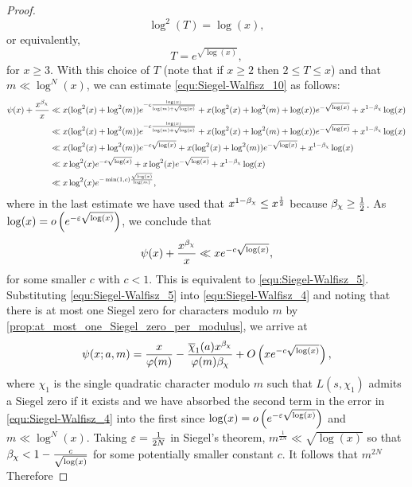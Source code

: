 \begin{proof}
      \[
        \log^{2}(T) = \log(x),
      \]
      or equivalently,
      \[
        T = e^{\sqrt{\log(x)}},
      \]
      for $x \ge 3$. With this choice of $T$ (note that if $x \ge 2$ then $2 \le T \le x$) and that $m \ll \log^{N}(x)$, we can estimate \cref{equ:Siegel-Walfisz_10} as follows:
      \begin{align*}
        \psi(x)+\frac{x^{\beta_{\chi}}}{x} &\ll x(\log^{2}(x)+\log^{2}(m))e^{-c\frac{\log(x)}{\log(m)+\sqrt{\log(x)}}}+x(\log^{2}(x)+\log^{2}(m)+\log(x))e^{-\sqrt{\log(x)}}+x^{1-\beta_{\chi}}\log(x) \\
        &\ll x(\log^{2}(x)+\log^{2}(m))e^{-c\frac{\log(x)}{\log(m)+\sqrt{\log(x)}}}+x(\log^{2}(x)+\log^{2}(m)+\log(x))e^{-\sqrt{\log(x)}}+x^{1-\beta_{\chi}}\log(x) \\
        &\ll x(\log^{2}(x)+\log^{2}(m))e^{-c\sqrt{\log(x)}}+x(\log^{2}(x)+\log^{2}(m))e^{-\sqrt{\log(x)}}+x^{1-\beta_{\chi}}\log(x) \\
        &\ll x\log^{2}(x)e^{-c\sqrt{\log(x)}}+x\log^{2}(x)e^{-\sqrt{\log(x)}}+x^{1-\beta_{\chi}}\log(x) \\
        &\ll x\log^{2}(x)e^{-\min(1,c)\frac{\sqrt{\log(x)}}{\log(m)}},
      \end{align*}
      where in the last estimate we have used that $x^{1-\beta_{\chi}} \le x^{\frac{1}{2}}$ because $\beta_{\chi} \ge \frac{1}{2}$. As $\log(x) = o\left(e^{-\varepsilon\sqrt{\log(x)}}\right)$, we conclude that
      \[
        \psi(x)+\frac{x^{\beta_{\chi}}}{x} \ll xe^{-c\sqrt{\log(x)}},
      \]
      for some smaller $c$ with $c < 1$. This is equivalent to \cref{equ:Siegel-Walfisz_5}. Substituting \cref{equ:Siegel-Walfisz_5} into \cref{equ:Siegel-Walfisz_4} and noting that there is at most one Siegel zero for characters modulo $m$ by \cref{prop:at_most_one_Siegel_zero_per_modulus}, we arrive at
      \begin{equation}\label{equ:Siegel-Walfisz_11}
        \psi(x;a,m) = \frac{x}{\varphi(m)}-\frac{\overline{\chi}_{1}(a)x^{\beta_{\chi}}}{\varphi(m)\beta_{\chi}}+O\left(xe^{-c\sqrt{\log(x)}}\right),
      \end{equation}
      where $\chi_{1}$ is the single quadratic character modulo $m$ such that $L(s,\chi_{1})$ admits a Siegel zero if it exists and we have absorbed the second term in the error in \cref{equ:Siegel-Walfisz_4} into the first since $\log(x) = o\left(e^{-\varepsilon\sqrt{\log(x)}}\right)$ and $m \ll \log^{N}(x)$. Taking $\varepsilon = \frac{1}{2N}$ in Siegel's theorem, $m^\frac{1}{2N} \ll \sqrt{\log(x)}$ so that $\beta_{\chi} < 1-\frac{c}{\sqrt{\log(x)}}$ for some potentially smaller constant $c$. It follows that $m^{2N}$ Therefore

\end{proof}

